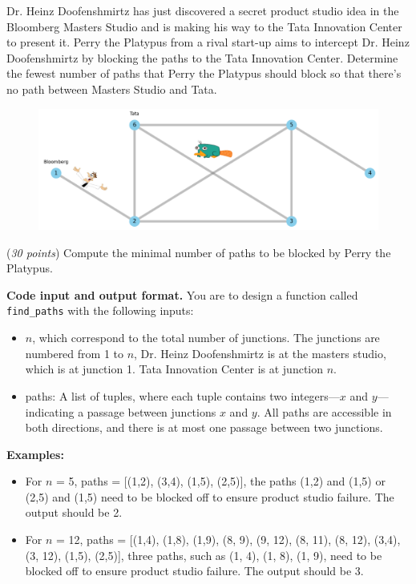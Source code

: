 \documentclass{hw}
\newcommand{\io}{\textbf{Code input and output format.} }
\begin{document}
\begin{problem}
Dr. Heinz Doofenshmirtz has just discovered a secret product studio idea in the Bloomberg Masters Studio and is making his way to the Tata Innovation Center to present it. Perry the Platypus from a rival start-up aims to intercept Dr. Heinz Doofenshmirtz by blocking the paths to the Tata Innovation Center. Determine the fewest number of paths that Perry the Platypus should block so that there's no path between Masters Studio and Tata.
\begin{figure}
    \centering
    \includegraphics[width=\columnwidth]{figures/edited.png}
    \label{fig:enter-label}
\end{figure}
\begin{subproblem}
(\textit{30 points})
    Compute the minimal number of paths to be blocked by Perry the Platypus. 
\end{subproblem}


\io You are to design a function called \texttt{find\_paths} with the following inputs:
\begin{itemize}
    \item $n$, which correspond to the total number of junctions. The junctions are numbered from 1 to $n$, Dr. Heinz Doofenshmirtz is at the masters studio, which is at junction 1. Tata Innovation Center is at junction $n$. 
    \item paths: A list of tuples, where each tuple contains two integers---$x$ and $y$---indicating a passage between junctions $x$ and $y$. All paths are accessible in both directions, and there is at most one passage between two junctions.
\end{itemize}

\textbf{Examples:}
\begin{itemize}
\item For $n$ = 5, paths = [(1,2), (3,4), (1,5), (2,5)], the paths (1,2) and (1,5) or (2,5) and (1,5) need to be blocked off to ensure product studio failure. The output should be 2.
\item For $n$ = 12, paths = [(1,4), (1,8), (1,9), (8, 9), (9, 12), (8, 11), (8, 12), (3,4), (3, 12), (1,5), (2,5)], three paths, such as (1, 4), (1, 8), (1, 9), need to be blocked off to ensure product studio failure. The output should be 3.
\end{itemize}
\end{problem}
\end{document}
